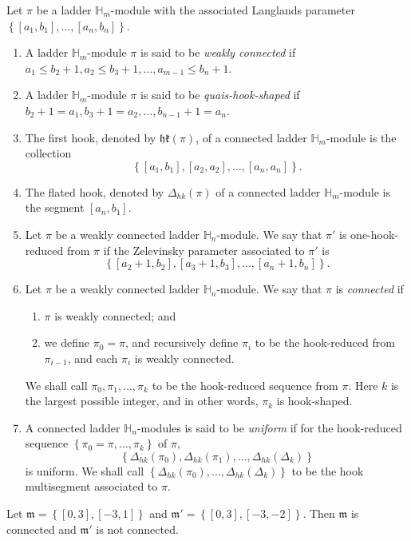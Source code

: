 \begin{definition}
Let $\pi$ be a ladder $\mathbb H_m$-module with the associated Langlands parameter $\left\{ [a_1, b_1], \ldots, [a_n, b_n]\right\}$.
\begin{enumerate}
\item A ladder $\mathbb H_m$-module $\pi$ is said to be {\it weakly connected} if $a_1 \leq b_2+1, a_2 \leq b_3+1, \ldots , a_{m-1} \leq b_n+1$.
\item A ladder $\mathbb H_m$-module $\pi$ is said to be {\it quais-hook-shaped} if $b_2+1=a_1, b_3+1=a_2, \ldots, b_{n-1}+1=a_n$.
\item The first hook, denoted by $\mathfrak{hk(\pi)}$, of a connected ladder $\mathbb H_m$-module is the collection  \[ \left\{ [a_1,b_1], [a_2,a_2], \ldots, [a_n,a_n] \right\}.\]
\item  The flated hook, denoted by $\Delta_{hk}(\pi)$ of a connected ladder $\mathbb H_m$-module is the segment $[a_n, b_1]$.
\item Let $\pi$ be a weakly connected ladder $\mathbb H_n$-module. We say that $\pi'$ is one-hook-reduced from $\pi$ if the Zelevinsky parameter associated to $\pi'$ is 
\[   \left\{  [a_2+1, b_2], [a_3+1,b_3], \ldots, [a_n+1, b_n] \right\} . 
\]
\item Let $\pi$ be a weakly connected ladder $\mathbb H_n$-module. We say that $\pi$ is {\it connected} if 
\begin{enumerate}
\item $\pi$ is weakly connected; and 
\item we define $\pi_0=\pi$, and recursively define $\pi_i$ to be the hook-reduced from $\pi_{i-1}$, and each $\pi_i$ is weakly connected.
\end{enumerate}
We shall call $\pi_0, \pi_1, \ldots, \pi_k$ to be the hook-reduced sequence from $\pi$.  Here $k$ is the largest possible integer, and in other words, $\pi_k$ is hook-shaped.
\item A connected ladder $\mathbb H_n$-modules is said to be {\it uniform} if for the hook-reduced sequence $\left\{ \pi_0=\pi, \ldots, \pi_k\right\}$ of $\pi$,
\[ \left\{ \Delta_{hk}(\pi_0), \Delta_{hk}(\pi_1), \ldots, \Delta_{hk}(\Delta_k) \right\}
\]
is uniform. We shall call  $\left\{ \Delta_{hk}(\pi_0), \ldots, \Delta_{hk}(\Delta_k) \right\}$ to be the hook multisegment associated to $\pi$.
\end{enumerate}
\end{definition}


\begin{example}
Let $\mathfrak m=\left\{ [0,3], [-3,1]\right\}$ and $\mathfrak m'=\left\{ [0,3], [-3,-2] \right\}$. Then $\mathfrak m$ is connected and $\mathfrak m'$ is not connected.
\end{example}

